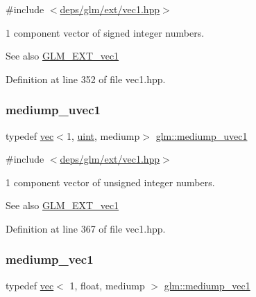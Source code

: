 {\ttfamily \#include $<$\hyperlink{ext_2vec1_8hpp}{deps/glm/ext/vec1.\+hpp}$>$}

1 component vector of signed integer numbers.

\begin{DoxySeeAlso}{See also}
\hyperlink{group__ext__vec1}{G\+L\+M\+\_\+\+E\+X\+T\+\_\+vec1} 
\end{DoxySeeAlso}


Definition at line 352 of file vec1.\+hpp.

\mbox{\label{group__ext__vec1_ga30942ba23745b3fd4ec1fbd3068f7de4}} 
\subsubsection{\texorpdfstring{mediump\+\_\+uvec1}{mediump\_uvec1}}
{\footnotesize\ttfamily typedef \hyperlink{structglm_1_1vec}{vec}$<$1, \hyperlink{group__core__precision_ga4fd29415871152bfb5abd588334147c8}{uint}, mediump$>$ \hyperlink{group__ext__vec1_ga30942ba23745b3fd4ec1fbd3068f7de4}{glm\+::mediump\+\_\+uvec1}}



{\ttfamily \#include $<$\hyperlink{ext_2vec1_8hpp}{deps/glm/ext/vec1.\+hpp}$>$}

1 component vector of unsigned integer numbers.

\begin{DoxySeeAlso}{See also}
\hyperlink{group__ext__vec1}{G\+L\+M\+\_\+\+E\+X\+T\+\_\+vec1} 
\end{DoxySeeAlso}


Definition at line 367 of file vec1.\+hpp.

\mbox{\label{group__ext__vec1_gab1c2ec8c0cbca8b1f2346f37926b77a7}} 
\subsubsection{\texorpdfstring{mediump\+\_\+vec1}{mediump\_vec1}}
{\footnotesize\ttfamily typedef \hyperlink{structglm_1_1vec}{vec}$<$ 1, float, mediump $>$ \hyperlink{group__ext__vec1_gab1c2ec8c0cbca8b1f2346f37926b77a7}{glm\+::mediump\+\_\+vec1}}



